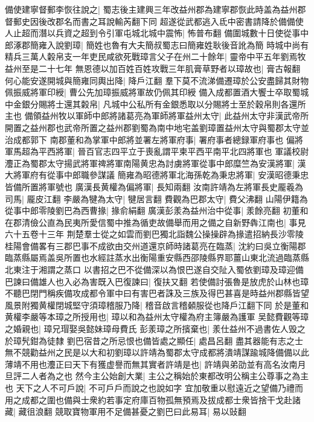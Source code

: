 備使建寧督郵李恢往說之|{
	蜀志後主建興三年改益州郡為建寧郡恢此時盖為益州郡督郵史因後改郡名而書之耳說輸芮翻下同}
超遂從武都逃入氐中密書請降於備備使人止超而潛以兵資之超到令引軍屯城北城中震怖|{
	怖普布翻}
備圍城數十日使從事中郎涿郡簡雍入說劉璋|{
	簡姓也魯有大夫簡叔蜀志曰簡雍姓耿後音訛為簡}
時城中尚有精兵三萬人糓帛支一年吏民咸欲死戰璋言父子在州二十餘年|{
	靈帝中平五年劉焉牧益州至是二十七年}
無恩德以加百姓百姓攻戰三年肌膏草野者以璋故也|{
	膏古報翻}
何心能安遂開城與簡雍同輿出降|{
	降戶江翻}
羣下莫不流涕備遷璋於公安盡歸其財物佩振威將軍印綬|{
	曹公先加璋振威將軍故仍佩其印綬}
備入成都置酒大饗士卒取蜀城中金銀分賜將士還其糓帛|{
	凡城中公私所有金銀悉取以分賜將士至於穀帛則各還所主也}
備領益州牧以軍師中郎將諸葛亮為軍師將軍益州太守|{
	此益州太守非漢武帝所開置之益州郡也武帝所置之益州郡劉蜀為南中地宅盖劉璋置益州太守與蜀郡太守並治成都郭下}
南郡董和為掌軍中郎將並署左將軍府事|{
	署府事者總録軍府事也}
偏將軍馬超為平西將軍|{
	晉百官志四平立于喪亂謂平柬平西平南平北四將軍也}
軍議校尉灋正為蜀郡太守揚武將軍禆將軍南陽黄忠為討虜將軍從事中郎糜竺為安漢將軍|{
	漢大將軍府有從事中郎職參謀議}
簡雍為昭德將軍北海孫乾為秉忠將軍|{
	安漢昭德秉忠皆備所置將軍號也}
廣漢長黄權為偏將軍|{
	長知兩翻}
汝南許靖為左將軍長史龎羲為司馬|{
	龎皮江翻}
李嚴為犍為太守|{
	犍居言翻}
費觀為巴郡太守|{
	費父沸翻}
山陽伊籍為從事中郎零陵劉巴為西曹掾|{
	掾俞絹翻}
廣漢彭羕為益州治中從事|{
	羕餘亮翻}
初董和在郡清儉公直為民夷所愛信蜀中推為循吏故備舉而用之備之自新野犇江南也|{
	事見六十五卷十三年}
荆楚羣士從之如雲而劉巴獨北詣魏公操操辟為掾遣招納長沙零陵桂陽會備畧有三郡巴事不成欲由交州道還京師時諸葛亮在臨蒸|{
	沈約曰吳立衡陽郡臨蒸縣屬焉盖吳所置也水經註蒸水出衡陽重安縣西邵陵縣界耶薑山東北流過臨蒸縣北東注于湘謂之蒸口}
以書招之巴不從備深以為恨巴遂自交阯入蜀依劉璋及璋迎備巴諫曰備雄人也入必為害既入巴復諫曰|{
	復扶又翻}
若使備討張魯是放虎於山林也璋不聽巴閉門稱疾備攻成都令軍中曰有害巴者誅及三族及得巴甚喜是時益州郡縣皆望風景附獨黄權閉城堅守須璋稽服乃降|{
	稽音啟言稽顙服從也降戶江翻下同}
於是董和黄權李嚴等本璋之所授用也|{
	璋以和為益州太守權為府主簿嚴為護軍}
吴懿費觀等璋之婚親也|{
	璋兄瑁娶吳懿妹璋母費氏}
彭羕璋之所擯棄也|{
	羕仕益州不過書佐人毁之於璋髠鉗為徒隸}
劉巴宿昔之所忌恨也備皆處之顯任|{
	處昌呂翻}
盡其器能有志之士無不競勸益州之民是以大和初劉璋以許靖為蜀郡太守成都將潰靖謀踰城降備備以此薄靖不用也灋正曰天下有獲虚譽而無其實者許靖是也|{
	許靖與弟劭並有高名汝南月旦評二人者為之也}
然今主公始創大業|{
	主公之稱始於東都改明公稱主公尊事之為主也}
天下之人不可戶說|{
	不可戶戶而說之也說如字}
宜加敬重以慰遠近之望備乃禮而用之成都之圍也備與士衆約若事定府庫百物孤無預焉及拔成都士衆皆捨干戈赴諸藏|{
	藏徂浪翻}
競取寶物軍用不足備甚憂之劉巴曰此易耳|{
	易以䜴翻}
